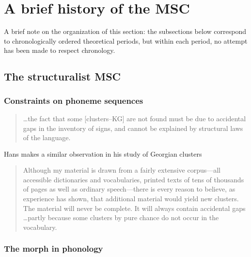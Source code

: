 \section{A brief history of the MSC}

A brief note on the organization of this section: the subsections below correspond to chronologically ordered theoretical periods, but within each period, no attempt has been made to respect chronology.

\subsection{The structuralist MSC}

\subsubsection{Constraints on phoneme sequences}

\begin{quotation}
\ldots the fact that some [clusters--KG] are not found must be due to accidental gaps in the inventory of signs, and cannot be explained by structural laws of the language. \citep[][]{Fischer-Jorgensen1952}
\end{quotation}

\noindent
Hans \citeauthor{Vogt1954} makes a similar observation in his study of Georgian clusters

\begin{quotation}
Although my material is drawn from a fairly extensive corpus---all accessible dictionaries and vocabularies, printed texts of tens of thousands of pages as well as ordinary speech---there is every reason to believe, as experience has shown, that additional material would yield new clusters. The material will never be complete. It will always contain accidental gaps \ldots partly because some clusters by pure chance do not occur in the vocabulary. \citep[][30]{Vogt1954}
\end{quotation}

\subsubsection{The morph in phonology}

